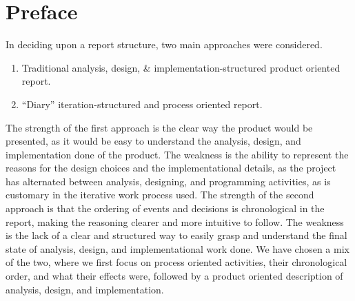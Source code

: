 
\begingroup
\let\clearpage\relax
\let\cleardoublepage\relax
\let\cleardoublepage\relax

\section*{Preface} %

\label{report_structure}

In deciding upon a report structure, two main approaches were considered.

\begin{enumerate}
	\item Traditional analysis, design, \& implementation-structured product oriented report.
	\item ``Diary'' iteration-structured and process oriented report.
\end{enumerate}

The strength of the first approach is the clear way the product would be presented, as it would be easy to understand the analysis, design, and implementation done of the product. 
The weakness is the ability to represent the reasons for the design choices and the implementational details, as the project has alternated between analysis, designing, and programming activities, as is customary in the iterative work process used. \newline
The strength of the second approach is that the ordering of events and decisions is chronological in the report, making the reasoning clearer and more intuitive to follow. 
The weakness is the lack of a clear and structured way to easily grasp and understand the final state of analysis, design, and implementational work done. \newline
We have chosen a mix of the two, where we first focus on process oriented activities, their chronological order, and what their effects were, followed by a product oriented description of analysis, design, and implementation.



